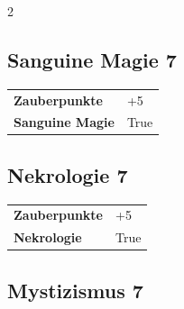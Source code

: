 \begin{multicols}{2}
\begin{tcolorbox}

\end{tcolorbox}

\begin{tcolorbox}
    \subsection*{Sanguine Magie \hfill \small{7 }}
    \tcblower




\begin{tabular}{@{}ll@{}}
    \textbf{Zauberpunkte} & +5\\
    \textbf{Sanguine Magie} & True\\
\end{tabular}


\end{tcolorbox}

\begin{tcolorbox}
    \subsection*{Nekrologie \hfill \small{7 }}
    \tcblower




\begin{tabular}{@{}ll@{}}
    \textbf{Zauberpunkte} & +5\\
    \textbf{Nekrologie} & True\\
\end{tabular}


\end{tcolorbox}

\begin{tcolorbox}
    \subsection*{Mystizismus \hfill \small{7 }}
    \tcblower





\end{tcolorbox}
\end{multicols}
